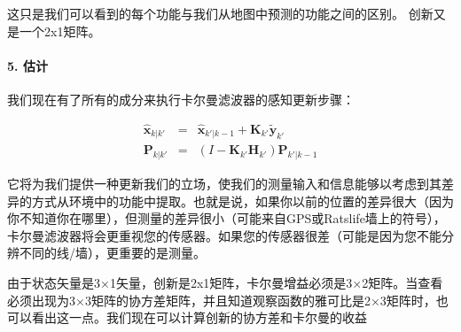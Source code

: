 这只是我们可以看到的每个功能与我们从地图中预测的功能之间的区别。 创新又是一个2x1矩阵。


\paragraph{5. 估计}
我们现在有了所有的成分来执行卡尔曼滤波器的感知更新步骤：

\begin{eqnarray}
\hat{\boldsymbol{x}}_{k|k'} &=& \hat{\boldsymbol{x}}_{k'|k-1} + \boldsymbol{K}_{k'}\tilde{\boldsymbol{y}}_{k'}\\
\boldsymbol{P}_{k|k'} &=& (I - \boldsymbol{K}_{k'} {\boldsymbol{H}_{k'}}) \boldsymbol{P}_{k'|k-1}
\end{eqnarray}



它将为我们提供一种更新我们的立场，使我们的测量输入和信息能够以考虑到其差异的方式从环境中的功能中提取。也就是说，如果你以前的位置的差异很大（因为你不知道你在哪里），但测量的差异很小（可能来自GPS或Ratslife墙上的符号），卡尔曼滤波器将会更重视您的传感器。如果您的传感器很差（可能是因为您不能分辨不同的线/墙），更重要的是测量。

由于状态矢量是3×1矢量，创新是2x1矩阵，卡尔曼增益必须是3×2矩阵。当查看必须出现为3×3矩阵的协方差矩阵，并且知道观察函数的雅可比是2×3矩阵时，也可以看出这一点。我们现在可以计算创新的协方差和卡尔曼的收益

